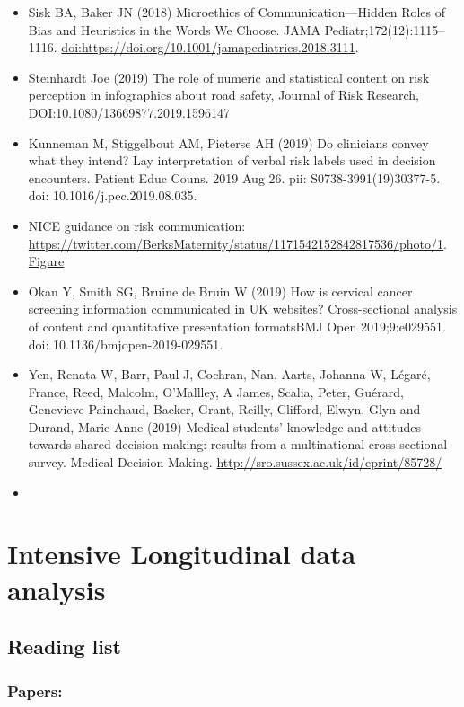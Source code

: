 \documentclass[]{book}
\begin{document}
\begin{itemize}
\item
  Sisk BA, Baker JN (2018) Microethics of Communication---Hidden Roles of Bias and Heuristics in the Words We Choose. JAMA Pediatr;172(12):1115--1116. \url{doi:https://doi.org/10.1001/jamapediatrics.2018.3111}.
\item
  Steinhardt Joe (2019) The role of numeric and statistical content on risk perception in infographics about road safety, Journal of Risk Research, \url{DOI:10.1080/13669877.2019.1596147}
\item
  Kunneman M, Stiggelbout AM, Pieterse AH (2019) Do clinicians convey what they intend? Lay interpretation of verbal risk labels used in decision encounters. Patient Educ Couns. 2019 Aug 26. pii: S0738-3991(19)30377-5. doi: 10.1016/j.pec.2019.08.035.
\item
  NICE guidance on risk communication: \url{https://twitter.com/BerksMaternity/status/1171542152842817536/photo/1}. \href{figures/mdm/nicenice_riskcommunication.jpeg}{Figure}
\item
  Okan Y, Smith SG, Bruine de Bruin W (2019) How is cervical cancer screening information communicated in UK websites? Cross-sectional analysis of content and quantitative presentation formatsBMJ Open 2019;9:e029551. doi: 10.1136/bmjopen-2019-029551.
\item
  Yen, Renata W, Barr, Paul J, Cochran, Nan, Aarts, Johanna W, Légaré, France, Reed, Malcolm, O'Mallley, A James, Scalia, Peter, Guérard, Genevieve Painchaud, Backer, Grant, Reilly, Clifford, Elwyn, Glyn and Durand, Marie-Anne (2019) Medical students' knowledge and attitudes towards shared decision-making: results from a multinational cross-sectional survey. Medical Decision Making. \url{http://sro.sussex.ac.uk/id/eprint/85728/}
\item
\end{itemize}

\hypertarget{ild}{%
\chapter{Intensive Longitudinal data analysis}\label{ild}}

\hypertarget{reading-list-2}{%
\section{Reading list}\label{reading-list-2}}

\hypertarget{papers}{%
\subsection{Papers:}\label{papers}}
\end{document}
